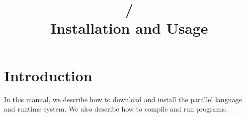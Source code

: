 \documentclass[10pt]{article}
\title{\charmpp{}/\converse{}\\Installation and Usage}
\begin{document}
\maketitle

\section{Introduction}
In this manual, we describe how to download and install the \charmpp{} 
parallel language and runtime system.  We also describe how to compile
and run \charmpp{} programs.




\end{document}
